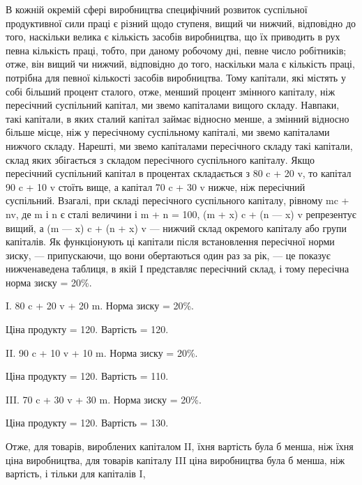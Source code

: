 В кожній окремій сфері виробництва специфічний розвиток
суспільної продуктивної сили праці є різний щодо ступеня,
вищий чи нижчий, відповідно до того, наскільки велика є кількість засобів виробництва, що їх
приводить в рух певна кількість праці, тобто, при даному робочому дні, певне число робітників; отже,
він вищий чи нижчий, відповідно до того, наскільки
мала є кількість праці, потрібна для певної кількості засобів
виробництва. Тому капітали, які містять у собі більший процент
сталого, отже, менший процент змінного капіталу, ніж пересічний суспільний капітал, ми звемо
капіталами вищого складу.
Навпаки, такі капітали, в яких сталий капітал займає відносно
менше, а змінний відносно більше місце, ніж у пересічному
суспільному капіталі, ми звемо капіталами нижчого складу.
Нарешті, ми звемо капіталами пересічного складу такі капітали,
склад яких збігається з складом пересічного суспільного капіталу. Якщо пересічний суспільний капітал
в процентах складається з 80 c + 20 v, то капітал 90 c + 10 v стоїть вище, а капітал 70 c + 30 v
нижче, ніж пересічний суспільний. Взагалі, при
складі пересічного суспільного капіталу, рівному mc + nv, де
m і n є сталі величини і m + n = 100, (m + x) c + (n — x) v репрезентує вищий, а (m — x) c + (n + x)
v — нижчий склад окремого капіталу або групи капіталів. Як функціонують ці капітали після
встановлення пересічної норми зиску, — припускаючи, що
вони обертаються один раз за рік, — це показує нижченаведена
таблиця, в якій I представляє пересічний склад, і тому пересічна норма зиску = 20\%.

I. 80 c + 20 v + 20 m. Норма зиску = 20\%.

Ціна продукту = 120. Вартість = 120.

II.    90 c + 10 v + 10 m. Норма зиску = 20\%.

Ціна продукту = 120. Вартість = 110.

III. 70 c + 30 v + 30 m. Норма зиску = 20\%.

Ціна продукту = 120. Вартість = 130.

Отже, для товарів, вироблених капіталом II, їхня вартість була б
менша, ніж їхня ціна виробництва, для товарів капіталу III ціна
виробництва була б менша, ніж вартість, і тільки для капіталів I,
\parbreak{}  %
